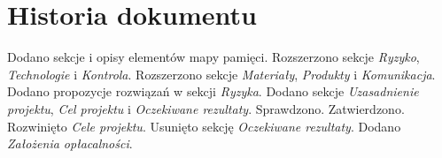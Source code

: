 \documentclass[10pt]{dokument-ppi}
\begin{document}
\section*{Historia dokumentu}
\begin{versions}
        Dodano sekcje i opisy elementów mapy pamięci.
        Rozszerzono sekcje \emph{Ryzyko}, \emph{Technologie} i \emph{Kontrola}.
        Rozszerzono sekcje \emph{Materiały}, \emph{Produkty} i \emph{Komunikacja}.
        Dodano propozycje rozwiązań w sekcji \emph{Ryzyka}.
        Dodano sekcje \emph{Uzasadnienie projektu}, \emph{Cel projektu} i
        \emph{Oczekiwane rezultaty}.
        Sprawdzono.
        Zatwierdzono.
        Rozwinięto \emph{Cele projektu}. Usunięto sekcję \emph{Oczekiwane
        rezultaty}. Dodano \emph{Założenia opłacalności}.
\end{versions}
\end{document}
